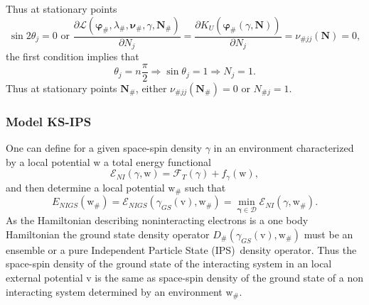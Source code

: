 \documentclass[aps,preprint]{revtex4}%
\begin{document}
Thus at stationary points
\begin{equation}
\sin2\theta_{j}=0\text{ or }\frac{\partial\mathcal{L}\left(  \mathbf{\varphi
}_{\#},\lambda_{\#},\mathbf{\nu}_{\#},\gamma,\mathbf{N}_{\#}\right)
}{\partial N_{j}}=\frac{\partial K_{U}\left(  \mathbf{\varphi}_{\#}\left(
\gamma,\mathbf{N}\right)  \right)  }{\partial N_{j}}=\nu_{\#jj}\left(
\mathbf{N}\right)  =0,
\end{equation}
the first condition implies that
\begin{equation}
\theta_{j}=n\frac{\pi}{2}\Rightarrow\sin\theta_{j}=1\Rightarrow N_{j}=1.
\end{equation}
Thus at stationary points $\mathbf{N}_{\#}$, either $\nu_{\#jj}\left(
\mathbf{N}_{\#}\right)  =0$ or $N_{\#j}=1.$

\subsubsection{Model KS-IPS}

One can define for a given space-spin density $\gamma$ in an environment
characterized by a local potential $\mathrm{w}$ a total energy functional
\begin{equation}
\mathcal{E}_{NI}\left(  \gamma\mathbf{,}\mathrm{w}\right)  =\mathcal{F}%
_{T}\left(  \gamma\right)  +f_{\gamma}\left(  \mathrm{w}\right)  ,
\end{equation}
and then determine a local potential $\mathrm{w}_{\#}$ such that
\begin{equation}
E_{NIGS}\left(  \mathrm{w}_{\#}\right)  =\mathcal{E}_{NIGS}\left(  \gamma
_{GS}\left(  \mathrm{v}\right)  \mathbf{,}\mathrm{w}_{\#}\right)
=\min_{\mathbf{\gamma\in}\mathcal{D}}\mathcal{E}_{NI}\left(  \gamma
\mathbf{,}\mathrm{w}_{\#}\right)  . \label{NIGS}%
\end{equation}
As the Hamiltonian describing noninteracting electrons is a one body
Hamiltonian the ground state density operator $D_{\#}\left(  \gamma
_{GS}\left(  \mathrm{v}\right)  \mathbf{,}\mathrm{w}_{\#}\right)  $ must be an
ensemble or a pure Independent Particle State (IPS)\ density operator. Thus
the space-spin density of the ground state of the interacting system in an
local external potential $\mathrm{v}$ is the same as space-spin density of the
ground state of a non interacting system determined by an environment
$\mathrm{w}_{\#}\mathrm{.}$
\end{document}
